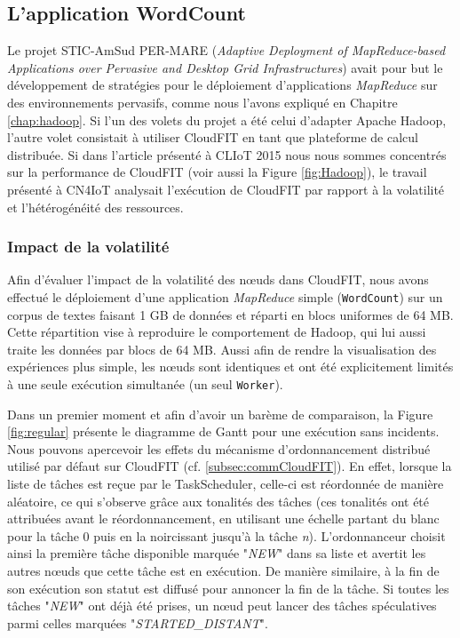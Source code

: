 \subsection{L'application WordCount}

Le projet STIC-AmSud PER-MARE (\textit{Adaptive Deployment of MapReduce-based Applications over Pervasive and Desktop Grid Infrastructures}) avait pour but le développement de stratégies pour le déploiement d'applications \textit{MapReduce} sur des environnements pervasifs, comme nous l'avons expliqué en Chapitre \ref{chap:hadoop}. Si l'un des volets du projet a été celui d'adapter Apache Hadoop, l'autre volet consistait à utiliser CloudFIT en tant que plateforme de calcul distribuée. Si dans l'article présenté à CLIoT 2015 \cite{Steffenel15Taormina} nous nous sommes concentrés sur la performance de CloudFIT (voir aussi la Figure \ref{fig:Hadoop}), le travail présenté à CN4IoT \cite{Steffenel2015Roma} analysait l'exécution de CloudFIT par rapport à la volatilité et l'hétérogénéité des ressources.

\subsubsection{Impact de la volatilité}

Afin d'évaluer l'impact de la volatilité des n{\oe}uds dans CloudFIT, nous avons effectué le déploiement d'une application \textit{MapReduce} simple (\texttt{WordCount}) sur un corpus de textes faisant 1 GB de données et réparti en blocs uniformes de 64 MB. Cette répartition vise à reproduire le comportement de Hadoop, qui lui aussi traite les données par blocs de 64 MB.  Aussi afin de rendre la visualisation des expériences plus simple, les n{\oe}uds sont identiques et ont été explicitement limités à une seule exécution simultanée (un seul \texttt{Worker}). 

Dans un premier moment et afin d'avoir un barème de comparaison, la Figure \ref{fig:regular} présente le diagramme de Gantt pour une exécution sans incidents. 
Nous pouvons apercevoir les effets du mécanisme d’ordonnancement distribué utilisé par défaut sur CloudFIT (cf. \ref{subsec:commCloudFIT}).
 En effet, lorsque la liste de tâches est reçue par le TaskScheduler, celle-ci est réordonnée de manière aléatoire, ce qui s'observe grâce aux tonalités des tâches (ces tonalités ont été attribuées avant le réordonnancement, en utilisant une échelle partant du blanc pour la tâche 0 puis en la noircissant jusqu'à la tâche \textit{n}). L'ordonnanceur choisit ainsi la première tâche disponible marquée "\textit{NEW}" dans sa liste et avertit les autres n{\oe}uds que cette tâche est en exécution. De manière similaire, à la fin de son exécution son statut est diffusé pour annoncer la fin de la tâche. Si toutes les tâches "\textit{NEW}" ont déjà été prises, un n{\oe}ud peut lancer des tâches spéculatives parmi celles marquées "\textit{STARTED\_DISTANT}". 

